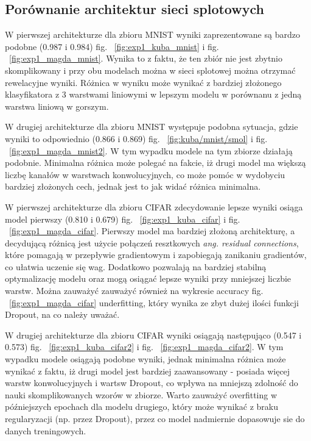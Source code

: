 \documentclass[10pt]{article}
\begin{document}
\subsection*{Porównanie architektur sieci splotowych}
W pierwszej architekturze dla zbioru MNIST wyniki zaprezentowane są bardzo podobne (0.987 i 0.984) fig. ~\ref{fig:exp1_kuba_mnist} i fig. ~\ref{fig:exp1_magda_mnist}.
Wynika to z faktu, że ten zbiór nie jest zbytnio skomplikowany i przy obu modelach można w sieci splotowej można otrzymać rewelacyjne wyniki.
Różnica w wyniku może wynikać z bardziej złożonego klasyfikatora z 3 warstwami liniowymi w lepszym modelu w porównanu z jedną warstwa liniową w gorszym.

W drugiej architekturze dla zbioru MNIST występuje podobna sytuacja, gdzie wyniki to odpowiednio (0.866 i 0.869) fig. ~\ref{fig:kuba/mnist/smol} i fig. ~\ref{fig:exp1_magda_mnist2}.
W tym wypadku modele na tym zbiorze działają podobnie.
Minimalna różnica może polegać na fakcie, iż drugi model ma większą liczbę kanałów w warstwach konwolucyjnych, co może pomóc w wydobyciu bardziej złożonych cech, jednak jest to jak widać różnica minimalna.

W pierwszej architekturze dla zbioru CIFAR zdecydowanie lepsze wyniki osiąga model pierwszy (0.810 i 0.679) fig. ~\ref{fig:exp1_kuba_cifar} i fig. ~\ref{fig:exp1_magda_cifar}.
Pierwszy model ma bardziej złożoną architekturę, a decydującą różnicą jest użycie połączeń resztkowych \textit{ang. \textquotedbl{}residual connections\textquotedbl{}}, które pomagają w przepływie gradientowym i zapobiegają zanikaniu gradientów, co ułatwia uczenie się wag.
Dodatkowo pozwalają na bardziej stabilną optymalizację modelu oraz mogą osiągać lepsze wyniki przy mniejszej liczbie warstw.
Można zauważyć zauważyć również na wykresie accuracy fig. ~\ref{fig:exp1_magda_cifar} underfitting, który wynika ze zbyt dużej ilości funkcji Dropout, na co należy uważać.


W drugiej architekturze dla zbioru CIFAR wyniki osiągają następująco (0.547 i 0.573) fig. ~\ref{fig:exp1_kuba_cifar2} i fig. ~\ref{fig:exp1_magda_cifar2}.
W tym wypadku modele osiągają podobne wyniki, jednak minimalna różnica może wynikać z faktu, iż drugi model jest bardziej zaawansowany - posiada więcej warstw konwolucyjnych i wartsw Dropout, co wpływa na mniejszą zdolność do nauki skomplikowanych wzorów w zbiorze.
Warto zauważyć overfitting w późniejszych epochach dla modelu drugiego, który może wynikać z braku regularyzacji (np.
przez Dropout), przez co model nadmiernie dopasowuje sie do danych treningowych.
\end{document}
